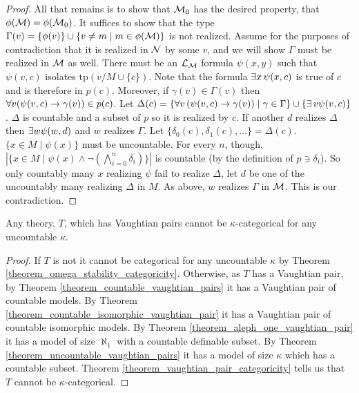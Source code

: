 \begin{proof}
All that remains is to show that \(\mathcal{M}_0\) has the desired property, that \(\phi(\mathcal{M}) = \phi(\mathcal{M}_0)\).   
It suffices to show that the type \(\Gamma(v) = \{\phi(v)\} \cup \{v \neq m \mid m \in \phi(\mathcal{M})\}\) is not realized. 
Assume for the purposes of contradiction that it is realized in \(\mathcal{N}\) by some \(v\), and we will show \(\Gamma\) must be realized in \(\mathcal{M}\) as well. 
There must be an \(\mathcal{L}_{\mathcal{M}}\) formula \(\psi(x, y)\) such that \(\psi(v, c)\) isolates \(\text{tp}(v/M \cup \{c\})\). %
Note that the formula \(\exists x \, \psi(x, c)\) is true of \(c\) and is therefore in \(p(c)\). 
Moreover, if \(\gamma(v) \in \Gamma(v)\) then \(\forall v (\psi(v, c) \to \gamma(v)) \in p(c)\). 
Let \(\Delta(c) = \{\forall v \, (\psi(v, c) \to \gamma(v)) \mid \gamma \in \Gamma\} \cup \{\exists \, v \psi(v, c)\}\).
\(\Delta\) is countable and a subset of \(p\) so it is realized by \(c\). 
If another \(d\) realizes \(\Delta\) then \(\exists w \psi(w, d)\) and \(w\) realizes \(\Gamma\).
Let \(\{\delta_0(c), \delta_1(c), \ldots\} = \Delta(c)\). 
\(\{x \in M \mid \psi(x)\}\) must be uncountable. 
For every \(n\), though, \(|\{x \in M \mid \psi(x) \land \neg (\bigwedge\limits_{i=0}^n\delta_i)\}|\) is countable (by the definition of \(p \ni \delta_i\)).
So only countably many \(x\) realizing \(\psi\) fail to realize \(\Delta\), let \(d\) be one of the uncountably many realizing \(\Delta\) in \(M\).
As above, \(w\) realizes \(\Gamma\) in \(\mathcal{M}\). This is our contradiction.  
\end{proof}

\begin{theorem}\label{theorem_vaughtian_pairs_categoricity}
Any theory, \(T\), which has Vaughtian pairs cannot be \(\kappa\)-categorical for any uncountable \(\kappa\).
\end{theorem}

\begin{proof}
If \(T\) is not \omst it cannot be categorical for any uncountable \(\kappa\) by Theorem \ref{theorem_omega_stability_categoricity}.
Otherwise, as \(T\) has a Vaughtian pair, by Theorem \ref{theorem_countable_vaughtian_pairs} it has a Vaughtian pair of countable models. 
By Theorem \ref{theorem_countable_isomorphic_vaughtian_pair} it has a Vaughtian pair of countable isomorphic models.
By Theorem \ref{theorem_aleph_one_vaughtian_pair} it has a model of size \(\aleph_1\) with a countable definable subset. 
By Theorem \ref{theorem_uncountable_vaughtian_pairs} it has a model of size \(\kappa\) which has a countable subset.  
Theorem \ref{theorem_vaughtian_pair_categoricity} tells us that \(T\) cannot be \(\kappa\)-categorical. 
\end{proof}

